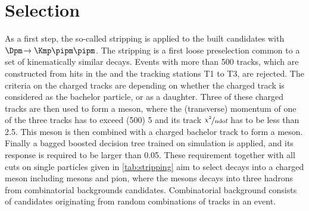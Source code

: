 \section{Selection}
\label{sec:selection}

As a first step, the so-called stripping is applied to the built \BdToDpi candidates with \mbox{$\Dpm\!\to\Kmp\pipm\pipm$}.
The stripping is a first loose preselection common to a set of kinematically similar decays.
Events with more than \num{500} tracks, which are constructed from hits in the \velo and the tracking stations T1 to T3, are rejected.
The criteria on the charged tracks are depending on whether the charged track is considered as the bachelor particle, or as a \Dm daughter.
Three of these charged tracks are then used to form a \Dm meson, where the (transverse) momentum of one of the three tracks has to exceed (\SI[per-mode=symbol]{500}{\MeVc}) \SI[per-mode=symbol]{5}{\GeVc} and its track $\nicefrac{\chi^2}{\text{ndof}}$ has to be less than \num{2.5}.
This \Dm meson is then combined with a charged bachelor track to form a \Bz meson.
Finally a bagged boosted decision tree trained on simulation is applied, and its response is required to be larger than \num{0.05}.
These requirement together with all cuts on single particles given in \cref{tab:stripping} aim to select \Bz decays into a charged \Dmp meson including \Dstarmp mesons and pion, where the \Dmp mesons decays into three hadrons from combinatorial backgrounds candidates.
Combinatorial background consists of candidates originating from random combinations of tracks in an event.
